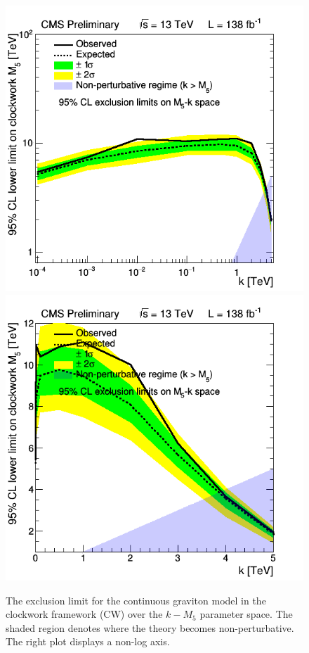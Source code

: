\begin{figure}[h!]\centering
\includegraphics[width=0.49\linewidth]{fig/LIMITPLOT_BBBE161718_CWk_real.png}
\includegraphics[width=0.47\linewidth]{fig/LIMITPLOT_BBBE161718_CWk_nonLog_real.png}
\caption{The exclusion limit for the continuous graviton model in the clockwork framework (CW) over the $k-M_5$ parameter space. The shaded region denotes where the theory becomes non-perturbative. The right plot displays a non-log axis. }
\label{Fig:LIMIT_Clockwork_real}
\end{figure}

